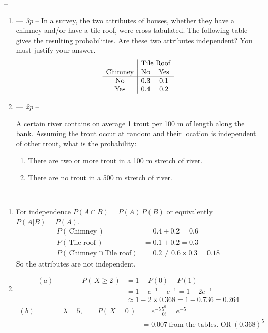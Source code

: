 \documentclass[11pt,paper=a4,abstract=on,parskip=half,DIV=calc,compact]{scrartcl}
\begin{document}
\begin{ExerciseList}
 --
\begin{enumerate}
\item --- {\em 3p} -- 
{
In a survey, the two attributes of  houses, whether they have a chimney and/or have a tile roof,
were cross tabulated. The following table gives the resulting probabilities.
Are these two attributes independent? You must justify your answer.
$$\begin{array}{c|cc}
& \multicolumn{2}{c}{\mbox{Tile Roof}} \\
\mbox{Chimney} & \mbox{No} & \mbox{Yes}  \\\hline
\mbox{No}  & 0.3 & 0.1 \\
\mbox{Yes} & 0.4 & 0.2 \\
\end{array}$$
}
\item --- {\em 2p} --  
{
A certain river contains on average 1 trout per 100 m of length along the bank.
Assuming the trout occur at random and their location is independent of
other trout, what is the probability:
\begin{enumerate}
\item There are two or more trout in a 100 m stretch of river.
\item There are no trout in a 500 m stretch of river.
\end{enumerate}
}
\end{enumerate}

\Answer
~\\
\begin{enumerate}%
\item 
{For independence $P(A\cap B) = P(A)\,P(B)$ or equivalently $P(A | B) = P(A)$.
\begin{align*}
P(\,\text{Chimney}\,) &= 0.4+0.2 = 0.6\\
P(\,\text{Tile roof}\,) &= 0.1+0.2 = 0.3\\
P(\, \text{Chimney}\cap\text{Tile roof} ) &= 0.2 \neq 0.6 \times 0.3 = 0.18
\end{align*}
So the attributes are not independent.
}
\item
{
\begin{align*}
(a)\qquad \qquad P(\, X \geq 2\,) &= 1-P(0)-P(1) \\
& = 1 -e^{-1}-e^{-1} = 1 -2e^{-1} \\
& \approx 1 -2\times 0.368 =1 -0.736=0.264
\end{align*}
\vspace*{5mm}
\begin{align*}
(b)  \qquad \qquad \lambda =5, \qquad
P(\, X=0\,) &= e^{-5} \frac{5^0}{0!} = e^{-5}\\
& =0.007 \ \text{from the tables.   OR}\ (0.368)^5
\end{align*}
}
\end{enumerate}



\end{ExerciseList}
\end{document}
